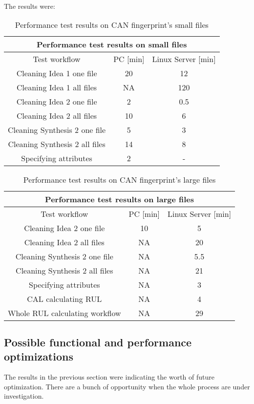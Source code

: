 The results were:
\begin{table}[H]
\centering
\begin{tabular}{ |c|c|c|  }
\hline
\multicolumn{3}{|c|}{Performance test results on small files} \\
\hline
Test workflow& PC [min] & Linux Server [min]\\
\hline
Cleaning Idea 1 one file& 20 & 12 \\
Cleaning Idea 1 all files& NA & 120 \\
Cleaning Idea 2 one file& 2 & 0.5 \\
Cleaning Idea 2 all files& 10 & 6 \\
Cleaning Synthesis 2 one file& 5 & 3 \\
Cleaning Synthesis 2 all files& 14 & 8 \\
Specifying attributes & 2 & - \\
\hline
\end{tabular}
\caption{Performance test results on CAN fingerprint's small files}
\label{table:1}
\end{table}

\begin{table}[H]
\centering
\begin{tabular}{ |c|c|c|  }
\hline
\multicolumn{3}{|c|}{Performance test results on large files} \\
\hline
Test workflow& PC [min] & Linux Server [min]\\
\hline
Cleaning Idea 2 one file& 10 & 5 \\
Cleaning Idea 2 all files& NA & 20 \\
Cleaning Synthesis 2 one file& NA & 5.5 \\
Cleaning Synthesis 2 all files& NA & 21 \\
Specifying attributes & NA & 3 \\
CAL calculating RUL & NA & 4 \\
Whole RUL calculating workflow & NA & 29 \\
\hline
\end{tabular}
\caption{Performance test results on CAN fingerprint's large files}
\label{table:2}
\end{table}
\subsection{Possible functional and performance optimizations}
The results in the previous section were indicating the worth of future optimization. There are a bunch of opportunity when the whole process are under investigation.

